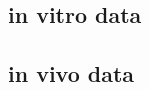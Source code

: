 \clearpage\newpage
\subsection{in vitro data} \label{sec:vitro}


\clearpage\newpage
\subsection{in vivo data} \label{sec:vivo}


% 
% 
% 
% 
% 
% 
% 


